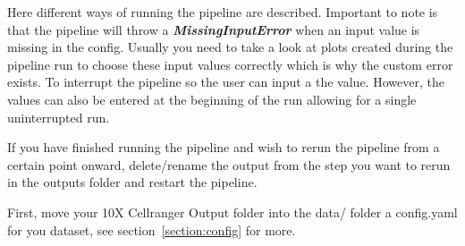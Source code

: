 Here different ways of running the pipeline are described. Important to note is that the pipeline will throw a \textbf{\textit{MissingInputError}} when an input value is missing in the config. Usually you need to take a look at plots created during the pipeline run to choose these input values correctly which is why the custom error exists. To interrupt the pipeline so the user can input a the value. However, the values can also be entered at the beginning of the run allowing for a single uninterrupted run.

If you have finished running the pipeline and wish to rerun the pipeline from a certain point onward, delete/rename the output from the step you want to rerun in the outputs folder and restart the pipeline.

First, move your 10X Cellranger Output folder into the data/ folder a config.yaml for you dataset, see section~\ref{section:config} for more.

